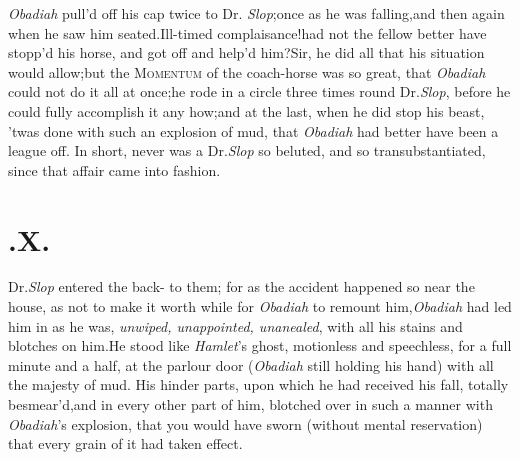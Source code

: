 \documentclass{article}
\begin{document}
\textit{Obadiah} pull’d off his cap twice to Dr.\@
\textit{Slop};\tsh once as he was falling,\tsk and then again
when he saw him seated.\tsk Ill-timed
complaisance!\tsh had not the fellow better have stopp’d his
horse, and got off and help’d him?\tsk Sir, he did all that
his situation would allow;\tsk but the\break
\textsc{Momentum} of the coach-horse was so great, that \textit{Obadiah} could not do it
all at once;\tsh he rode in a circle three times round Dr.\@ \textit{Slop},
before he could fully accomplish it any how;\tsk and at the last, when
he did stop his beast, ’twas done with such an explosion of
mud, that \textit{Obadiah} had better have been a league
off.\break
In short, never was a Dr.\@ \textit{Slop} so beluted, and so
transubstantiated, since that affair\break
came into fashion.\\
\newpage
\null
\section{.\enspace  X.}

 Dr.\@ \textit{Slop} entered the back-\break
{}\break
{}\break
{}
to them; for as the accident happened so near the house, as not to make it worth while for
\textit{Obadiah} to remount him,\tsk\break \textit{Obadiah} had led
him in as he was, \textit{un\-wiped, unappointed, unanealed}, with all
his stains and blotches on him.\tsk He stood like
\textit{Hamlet}’s ghost, motionless and speechless, for a full
minute and a half, at the parlour door (\textit{Obadiah} still holding
his hand) with all the majesty of mud. His hinder parts, upon which he had
received his fall, totally besmear’d,\tsh and
in every other part of him, blotched over in such a manner with
\textit{Obadiah}’s explosion, that you would have sworn
(without mental reservation) that every grain of it had taken
effect.
\end{document}
